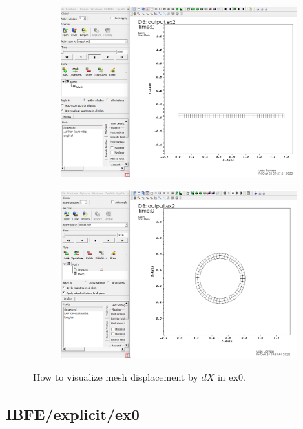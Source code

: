 \documentclass[12pt,a4paper,twoside]{article}
\begin{document}
\begin{figure}[H]
    \begin{subfigure}[b]{0.45\textwidth}
         \centering
        \includegraphics[width=\textwidth]{viz_mesh.png}
         \end{subfigure}
     \hfill
     \begin{subfigure}[b]{0.45\textwidth}
     \centering
    \includegraphics[width=\textwidth]{vix_mesh_displace.png}
     \end{subfigure}
     \caption{How to visualize mesh displacement by $dX$ in ex0.}
\end{figure}

\subsection{IBFE/explicit/ex0}
\end{document}
